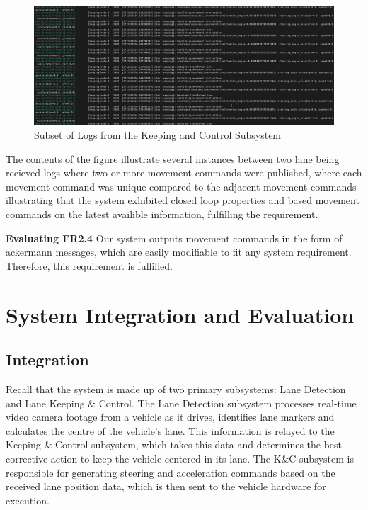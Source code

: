 \documentclass[titlepage,draft]{article}
\begin{document}
{\begin{figure}
	\centering
	\includegraphics[width=6in]{fr23}
	\caption{Subset of Logs from the Keeping and Control Subsystem }
	\label{fig:fr23}
\end{figure}

The contents of the figure illustrate several instances between two lane being recieved logs where two or more movement commands were published, where each movement command was unique compared to the adjacent movement commands illustrating that the system exhibited closed loop properties and based movement commands on the latest availible information, fulfilling the requirement.

\textbf{Evaluating FR2.4}
Our system outputs movement commands in the form of ackermann messages, which are easily modifiable to fit any system requirement. Therefore, this requirement is fulfilled.


\section{System Integration and Evaluation}

\subsection{Integration}
Recall that the system is made up of two primary subsystems: Lane Detection and Lane Keeping \& Control. The Lane Detection subsystem processes real-time video camera footage from a vehicle as it drives, identifies lane markers and calculates the centre of the vehicle’s lane. This information is relayed to the Keeping \& Control subsystem, which takes this data and determines the best corrective action to keep the vehicle centered in its lane. The K\&C subsystem is responsible for generating steering and acceleration commands based on the received lane position data, which is then sent to the vehicle hardware for execution.


}
\end{document}
